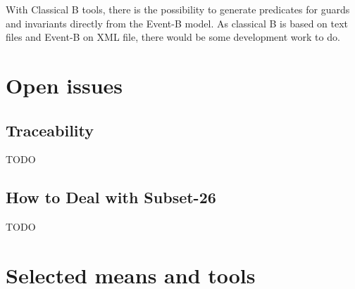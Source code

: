   With Classical B tools, there is the possibility to generate predicates for
  guards and invariants directly from the Event-B model. As classical B is based
  on text files and Event-B on XML file, there would be some development work to
  do.


%

\section{Open issues}

\subsection{Traceability}

TODO

\subsection{How to Deal with Subset-26}

TODO

%
%

\section{Selected means and tools}

\begin{comment}
To complete after decision meeting with a section for each tool with the following contents:

\begin{itemize}
\item description of the means or tools, references and links
\item added value for openETCS
\item for which tasks and how (input/output/actions) is the mean or tools used.
\end{itemize}
\end{comment}